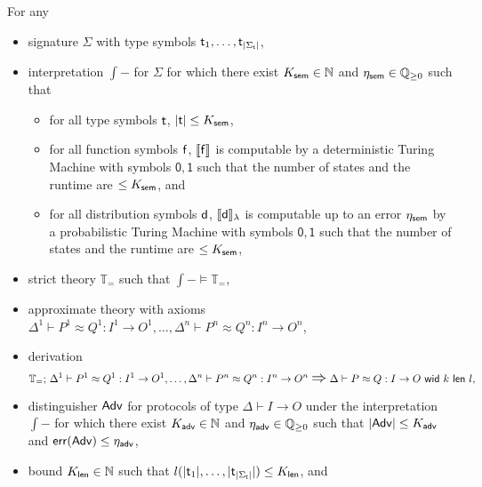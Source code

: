 \begin{corollary}\label{lem:soundness_approximate}
For any
\begin{itemize}
\item \ipdl signature $\Sigma$ with type symbols $\mathsf{t}_1,\ldots,\mathsf{t}_{|\Sigma_\mathsf{t}|}$,

\item interpretation $\int{-}$ for $\Sigma$ for which there exist $K_{\mathsf{sem}} \in \mathbb{N}$ and $\eta_{\mathsf{sem}} \in \mathbb{Q}_{\geq 0}$ such that
\begin{itemize}
\item for all type symbols $\mathsf{t}$, $|\mathsf{t}| \leq K_{\mathsf{sem}}$,

\item for all function symbols $\mathsf{f}$, $\llbracket \mathsf{f} \rrbracket$ is computable by a deterministic Turing Machine with symbols $\mathsf{0}, \mathsf{1}$ such that the number of states and the runtime are $\leq K_{\mathsf{sem}}$, and

\item for all distribution symbols $\mathsf{d}$, $\llbracket \mathsf{d} \rrbracket_\lambda$ is computable up to an error $\eta_{\mathsf{sem}}$ by a probabilistic Turing Machine with symbols $\mathsf{0}, \mathsf{1}$ such that the number of states and the runtime are $\leq K_{\mathsf{sem}}$,
\end{itemize}

\item strict \ipdl theory $\mathbb{T}_=$ such that $\int{-} \vDash \mathbb{T}_=$,

\item approximate \ipdl theory with axioms $\Delta^1 \vdash P^1 \approx Q^1 : I^1 \to O^1, \ldots, \Delta^n \vdash P^n \approx Q^n : I^n \to O^n$,

\item derivation \[\mathbb{T}_=; \, \Delta^1 \vdash P^1 \approx Q^1 : I^1 \to O^1, \ldots, \Delta^n \vdash P^n \approx Q^n : I^n \to O^n \; \mathlarger{\mathlarger{\Rightarrow}} \; \Delta \vdash \approxeq{P}{Q}{I}{O}{k}{l},\]%

\item distinguisher $\mathsf{Adv}$ for protocols of type $\Delta \vdash I \to O$ under the interpretation $\int{-}$ for which there exist $K_{\mathsf{adv}} \in \mathbb{N}$ and $\eta_{\mathsf{adv}} \in \mathbb{Q}_{\geq 0}$ such that $|\mathsf{Adv}| \leq K_{\mathsf{adv}}$ and $\mathsf{err}(\mathsf{Adv}) \leq \eta_{\mathsf{adv}}$,

\item bound $K_{\mathsf{len}} \in \mathbb{N}$ such that $l(|\mathsf{t}_1|,\ldots,|\mathsf{t}_{|\Sigma_\mathsf{t}|}|) \leq K_{\mathsf{len}}$, and


\end{itemize}
\end{corollary}
